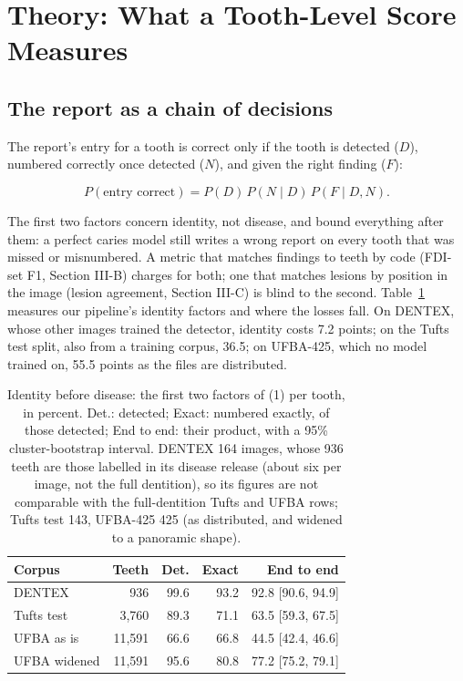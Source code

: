 \documentclass[conference]{IEEEtran}
\begin{document}
\section{Theory: What a Tooth-Level Score Measures}

\subsection{The report as a chain of decisions}

The report's entry for a tooth is correct only if the tooth is detected ($D$), numbered correctly once detected ($N$), and given the right finding ($F$):

\begin{equation}
P(\text{entry correct}) = P(D)\, P(N \mid D)\, P(F \mid D, N).
\end{equation}

The first two factors concern identity, not disease, and bound everything after them: a perfect caries model still writes a wrong report on every tooth that was missed or misnumbered. A metric that matches findings to teeth by code (FDI-set F1, Section III-B) charges for both; one that matches lesions by position in the image (lesion agreement, Section III-C) is blind to the second. Table~\ref{tab:1} measures our pipeline's identity factors and where the losses fall. On DENTEX, whose other images trained the detector, identity costs 7.2 points; on the Tufts test split, also from a training corpus, 36.5; on UFBA-425, which no model trained on, 55.5 points as the files are distributed.

\begin{table}[t]
\centering
\caption{Identity before disease: the first two factors of (1) per tooth, in percent. Det.: detected; Exact: numbered exactly, of those detected; End to end: their product, with a 95\% cluster-bootstrap interval. DENTEX 164 images, whose 936 teeth are those labelled in its disease release (about six per image, not the full dentition), so its figures are not comparable with the full-dentition Tufts and UFBA rows; Tufts test 143, UFBA-425 425 (as distributed, and widened to a panoramic shape).}
\label{tab:1}
\footnotesize
\setlength{\tabcolsep}{3pt}
\begin{tabular}{>{\raggedright\arraybackslash}p{2.42cm}rrrr}
\toprule
Corpus & Teeth & Det. & Exact & End to end \\
\midrule
DENTEX & 936 & 99.6 & 93.2 & 92.8 [90.6, 94.9] \\
Tufts test & 3,760 & 89.3 & 71.1 & 63.5 [59.3, 67.5] \\
UFBA as is & 11,591 & 66.6 & 66.8 & 44.5 [42.4, 46.6] \\
UFBA widened & 11,591 & 95.6 & 80.8 & 77.2 [75.2, 79.1] \\
\bottomrule
\end{tabular}
\end{table}
\end{document}
